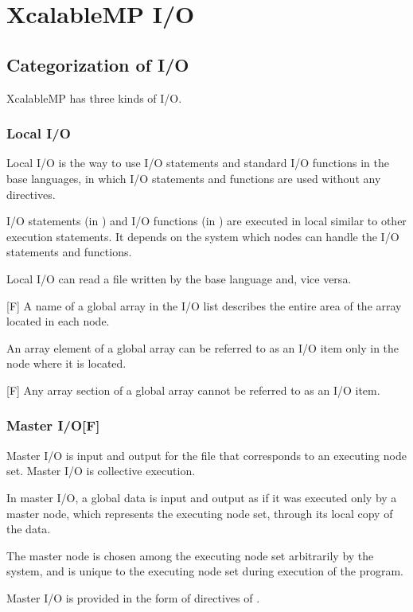 
 \chapter{XcalableMP I/O}

 \section{Categorization of I/O}
 XcalableMP has three kinds of I/O.

  \subsection{Local I/O}

  Local I/O is the way to use I/O statements and standard I/O functions in the
  base languages, in which I/O statements and functions are used without
  any directives.

  I/O statements (in {\XMP} {\Fort}) and I/O functions (in {\XMP} {\C})
  are executed in local similar to other execution statements.
  It depends on the system which nodes can handle the I/O statements and
  functions.

  Local I/O can read a file written by the base language and, vice
  versa.

  [F] A name of a global array in the I/O list describes the
  entire area of the array located in each node.

  An array element of a global array can be referred to as an I/O item only
  in the node where it is located.

  [F] Any array section of a global array cannot be referred to as an
  I/O item.

  \subsection{Master I/O[F]}

  Master I/O is input and output for the file that corresponds to an
  executing node set.
  Master I/O is collective execution.

  In master I/O, a global data is input and output as if it was executed
  only by a master node, which represents the executing node set, through
  its local copy of the data.

  The master node is chosen among the executing node set arbitrarily by the
  system, and is unique to the executing node set during execution of
  the program.

  Master I/O is provided in the form of directives of {\XMP} {\Fort}.


